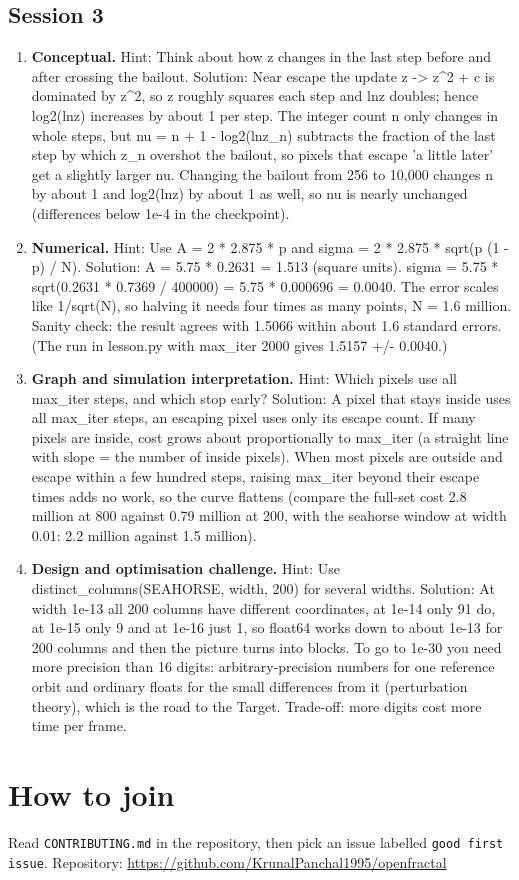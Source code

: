 \documentclass[11pt,a4paper]{article}
\begin{document}
\subsection*{Session 3}
\begin{enumerate}[nosep]
\item \textbf{Conceptual.} Hint: Think about how \textbar{}z\textbar{} changes in the last step before and after crossing the bailout. Solution: Near escape the update z -\textgreater{} z\textasciicircum{}2 + c is dominated by z\textasciicircum{}2, so \textbar{}z\textbar{} roughly squares each step and ln\textbar{}z\textbar{} doubles; hence log2(ln\textbar{}z\textbar{}) increases by about 1 per step. The integer count n only changes in whole steps, but nu = n + 1 - log2(ln\textbar{}z\_n\textbar{}) subtracts the fraction of the last step by which \textbar{}z\_n\textbar{} overshot the bailout, so pixels that escape 'a little later' get a slightly larger nu. Changing the bailout from 256 to 10,000 changes n by about 1 and log2(ln\textbar{}z\textbar{}) by about 1 as well, so nu is nearly unchanged (differences below 1e-4 in the checkpoint).
\item \textbf{Numerical.} Hint: Use A = 2 * 2.875 * p and sigma = 2 * 2.875 * sqrt(p (1 - p) / N). Solution: A = 5.75 * 0.2631 = 1.513 (square units). sigma = 5.75 * sqrt(0.2631 * 0.7369 / 400000) = 5.75 * 0.000696 = 0.0040. The error scales like 1/sqrt(N), so halving it needs four times as many points, N = 1.6 million. Sanity check: the result agrees with 1.5066 within about 1.6 standard errors. (The run in lesson.py with max\_iter 2000 gives 1.5157 +/- 0.0040.)
\item \textbf{Graph and simulation interpretation.} Hint: Which pixels use all max\_iter steps, and which stop early? Solution: A pixel that stays inside uses all max\_iter steps, an escaping pixel uses only its escape count. If many pixels are inside, cost grows about proportionally to max\_iter (a straight line with slope = the number of inside pixels). When most pixels are outside and escape within a few hundred steps, raising max\_iter beyond their escape times adds no work, so the curve flattens (compare the full-set cost 2.8 million at 800 against 0.79 million at 200, with the seahorse window at width 0.01: 2.2 million against 1.5 million).
\item \textbf{Design and optimisation challenge.} Hint: Use distinct\_columns(SEAHORSE, width, 200) for several widths. Solution: At width 1e-13 all 200 columns have different coordinates, at 1e-14 only 91 do, at 1e-15 only 9 and at 1e-16 just 1, so float64 works down to about 1e-13 for 200 columns and then the picture turns into blocks. To go to 1e-30 you need more precision than 16 digits: arbitrary-precision numbers for one reference orbit and ordinary floats for the small differences from it (perturbation theory), which is the road to the Target. Trade-off: more digits cost more time per frame.
\end{enumerate}

\section{How to join}
Read \texttt{CONTRIBUTING.md} in the repository, then pick an issue labelled \texttt{good first issue}. Repository: \url{https://github.com/KrunalPanchal1995/openfractal}
\end{document}
